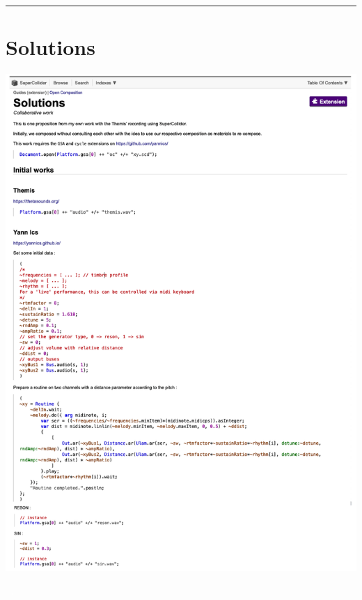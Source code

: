 \begin{center}\rule{0.5\linewidth}{0.5pt}\end{center}

\bigskip


\section*{Solutions}
%
%
\vspace{4mm}

\includegraphics[width=\textwidth]{mp/img/S1}

\newpage
\textcolor{white}{...}
\vspace{4mm}

